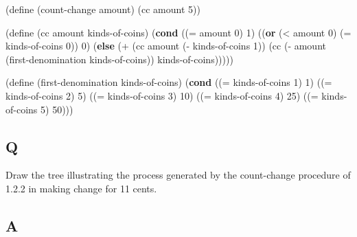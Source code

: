 \documentclass[
]{article}
\newenvironment{Shaded}{}{}
\newcommand{\DecValTok}[1]{\textcolor[rgb]{0.25,0.63,0.44}{#1}}
\newcommand{\ExtensionTok}[1]{#1}
\newcommand{\FunctionTok}[1]{\textcolor[rgb]{0.02,0.16,0.49}{#1}}
\newcommand{\KeywordTok}[1]{\textcolor[rgb]{0.00,0.44,0.13}{\textbf{#1}}}
\newcommand{\NormalTok}[1]{#1}
\newcommand{\OperatorTok}[1]{\textcolor[rgb]{0.40,0.40,0.40}{#1}}
\begin{document}
\hypertarget{count-change}{%
\label{count-change}}%
\begin{Shaded}
\begin{Highlighting}[numbers=left,,]
\NormalTok{(}\ExtensionTok{define}\FunctionTok{ }\NormalTok{(count{-}change amount)}
\NormalTok{  (cc amount }\DecValTok{5}\NormalTok{))}

\NormalTok{(}\ExtensionTok{define}\FunctionTok{ }\NormalTok{(cc amount kinds{-}of{-}coins)}
\NormalTok{  (}\KeywordTok{cond}\NormalTok{ ((}\OperatorTok{=}\NormalTok{ amount }\DecValTok{0}\NormalTok{) }\DecValTok{1}\NormalTok{)}
\NormalTok{        ((}\KeywordTok{or}\NormalTok{ (}\OperatorTok{\textless{}}\NormalTok{ amount }\DecValTok{0}\NormalTok{)}
\NormalTok{             (}\OperatorTok{=}\NormalTok{ kinds{-}of{-}coins }\DecValTok{0}\NormalTok{))}
         \DecValTok{0}\NormalTok{)}
\NormalTok{        (}\KeywordTok{else}
\NormalTok{         (}\OperatorTok{+}\NormalTok{ (cc amount (}\OperatorTok{{-}}\NormalTok{ kinds{-}of{-}coins }\DecValTok{1}\NormalTok{))}
\NormalTok{            (cc (}\OperatorTok{{-}}\NormalTok{ amount (first{-}denomination}
\NormalTok{                           kinds{-}of{-}coins))}
\NormalTok{                kinds{-}of{-}coins)))))}

\NormalTok{(}\ExtensionTok{define}\FunctionTok{ }\NormalTok{(first{-}denomination kinds{-}of{-}coins)}
\NormalTok{  (}\KeywordTok{cond}\NormalTok{ ((}\OperatorTok{=}\NormalTok{ kinds{-}of{-}coins }\DecValTok{1}\NormalTok{) }\DecValTok{1}\NormalTok{)}
\NormalTok{        ((}\OperatorTok{=}\NormalTok{ kinds{-}of{-}coins }\DecValTok{2}\NormalTok{) }\DecValTok{5}\NormalTok{)}
\NormalTok{        ((}\OperatorTok{=}\NormalTok{ kinds{-}of{-}coins }\DecValTok{3}\NormalTok{) }\DecValTok{10}\NormalTok{)}
\NormalTok{        ((}\OperatorTok{=}\NormalTok{ kinds{-}of{-}coins }\DecValTok{4}\NormalTok{) }\DecValTok{25}\NormalTok{)}
\NormalTok{        ((}\OperatorTok{=}\NormalTok{ kinds{-}of{-}coins }\DecValTok{5}\NormalTok{) }\DecValTok{50}\NormalTok{)))}
\end{Highlighting}
\end{Shaded}

\hypertarget{q-13}{%
\subsection{Q}\label{q-13}}

Draw the tree illustrating the process generated by the count-change
procedure of 1.2.2 in making change for 11 cents.

\hypertarget{a-12}{%
\subsection{A}\label{a-12}}
\end{document}
